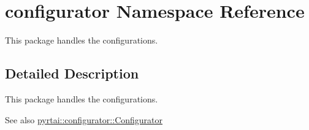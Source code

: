 \hypertarget{namespaceconfigurator}{
\section{configurator \-Namespace \-Reference}
\label{namespaceconfigurator}
}


\-This package handles the configurations.  




\subsection{\-Detailed \-Description}
\-This package handles the configurations. \begin{DoxySeeAlso}{\-See also}
\hyperlink{classpyrtai_1_1configurator_1_1_configurator}{pyrtai\-::configurator\-::\-Configurator} 
\end{DoxySeeAlso}

